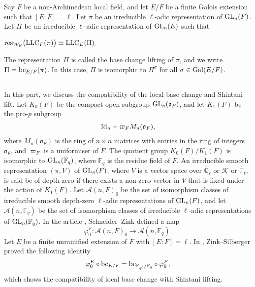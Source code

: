 \documentclass[10pt, reqno]{amsart}
\theoremstyle{plain}
\numberwithin{equation}{section} \newcommand{\di}{\operatorname{dim}}
\begin{document}
Say $F$ be a non-Archimedean local field, and let $E/F$ be a finite
Galois extension such that $[E:F]=\ell$.  Let $\pi$ be an irreducible
$\ell$-adic representation of ${\rm GL}_n(F)$. Let $\Pi$ be an
irreducible $\ell$-adic representation of ${\rm GL}_n(E)$ such that
\begin{center}
  ${\rm res}_{\mathcal{W}_E} \big({\rm LLC}_F(\pi)\big) \simeq {\rm
    LLC}_E(\Pi)$.
\end{center}
The representation $\Pi$ is called the base change lifting of
$\pi$, and we write $\Pi = {\rm bc}_{E/F}(\pi)$.  In this case, $\Pi$ is
isomorphic to $\Pi^\sigma$ for all $\sigma \in{\rm Gal}(E/F)$.
\subsection{}\label{comp_LLC_Shintani}
In this part, we discuss the compatibility of the local base change
and Shintani lift.
Let $K_0(F)$ be the compact open subgroup ${\rm GL}_n(\mathfrak{o}_F)$, and
let $K_1(F)$ be the pro-$p$ subgroup
$$ {\rm Id}_n + \varpi_FM_n(\mathfrak{o}_F), $$
where $M_n(\mathfrak{o}_F)$ is the ring of $n\times n$ matrices with
entries in the ring of integers $\mathfrak{o}_F$, and $\varpi_F$ is a
uniformiser of $F$. The quotient group $K_0(F)/K_1(F)$ is isomorphic
to ${\rm GL}_n(\mathbb{F}_q)$, where $\mathbb{F}_q$ is the residue
field of $F$.  An irreducible smooth representation $(\pi,V)$ of
${\rm GL}_n(F)$, where $V$ is a vector space over
$\overline{\mathbb{Q}}_\ell$ or $\mathcal{K}$ or
$\overline{\mathbb{F}}_\ell$, is said be of depth-zero if there exists
a non-zero vector in $V$ that is fixed under the action of $K_1(F)$.
 Let $\mathcal{A}(n,F)_0$ be the set of isomorphism
classes of irreducible smooth depth-zero $\ell$-adic representations
of ${\rm GL}_n(F)$, and let $\mathcal{A}(n,\mathbb{F}_q)$ be the set
of isomorphism classes of irreducible $\ell$-adic representations of
${\rm GL}_n(\mathbb{F}_q)$. In the article \cite[Section A.1.3]{Zink_Schneider},
Schneider--Zink defined a map
$$ \varphi_0^F : \mathcal{A}(n,F)_0
\longrightarrow \mathcal{A}(n,\mathbb{F}_q). $$ 
Let $E$ be a finite unramified extension of $F$ with $[E:F]=\ell$.
In \cite[Appendix A, equation (A.7)]{Zink_Silberger_Shintani_LLC},
Zink--Silberger proved the following identity
\begin{equation}\label{Comp_llc_shintani}
\varphi_0^E \circ {\rm bc}_{E/F}
= {\rm bc}_{\mathbb{F}_{q^\ell}/\mathbb{F}_q} 
\circ \varphi_0^F,
\end{equation}
which shows the compatibility of local base change with Shintani lifting.
\end{document}
